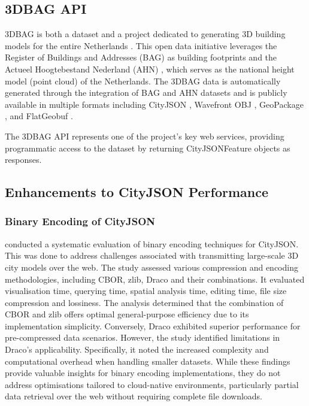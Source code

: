 \subsection{3DBAG API}
\label{rw:cityjson_enhancements:3dbag_api}

3DBAG is both a dataset and a project dedicated to generating 3D building models for the entire Netherlands \citep{3dbag}. This open data initiative leverages the Register of Buildings and Addresses (BAG) as building footprints and the Actueel Hoogtebestand Nederland (AHN) \citep{ahn}, which serves as the national height model (point cloud) of the Netherlands. The 3DBAG data is automatically generated through the integration of BAG and AHN datasets and is publicly available in multiple formats including CityJSON \citep{ledoux_2019}, Wavefront OBJ \citep{wavefront_obj}, GeoPackage \citep{geopackage}, and FlatGeobuf \citep{flatgeobuf}.

The 3DBAG API \citep{3dbag_api} represents one of the project's key web services, providing programmatic access to the dataset by returning CityJSONFeature objects as responses.

\subsection{Enhancements to CityJSON Performance}
\label{rw:cityjson_enhancements:performance}

\subsubsection{Binary Encoding of CityJSON}
\label{rw:cityjson_enhancements:performance:binary_encoding}

\citet{jordi_van_liempt_2020} conducted a systematic evaluation of binary encoding techniques for CityJSON.
This was done to address challenges associated with transmitting large-scale 3D city models over the web.
The study assessed various compression and encoding methodologies, including CBOR, zlib, Draco and their combinations.
It evaluated visualisation time, querying time, spatial analysis time, editing time, file size compression and lossiness.
The analysis determined that the combination of CBOR and zlib offers optimal general-purpose efficiency due to its implementation simplicity.
Conversely, Draco exhibited superior performance for pre-compressed data scenarios.
However, the study identified limitations in Draco's applicability.
Specifically, it noted the increased complexity and computational overhead when handling smaller datasets.
While these findings provide valuable insights for binary encoding implementations, they do not address optimisations tailored to cloud-native environments, particularly partial data retrieval over the web without requiring complete file downloads.

